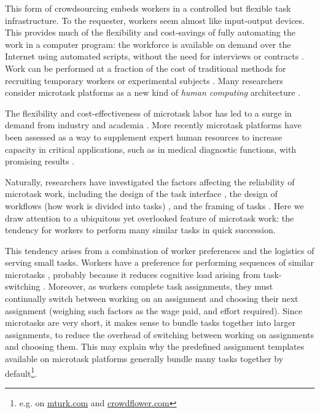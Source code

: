 \documentclass{sigchi}
\begin{document}
This form of crowdsourcing embeds workers in a controlled but flexible
task infrastructure.  
To the requester, workers seem almost like input-output devices.  
This provides much of the flexibility and 
cost-savings of fully automating the work in a computer program: 
the workforce is available on demand over the Internet using automated 
scripts, without the need for interviews or contracts 
\cite{wolfson2011look,5543192}.
Work can be performed at a fraction of the cost of traditional methods for 
recruiting temporary workers or experimental subjects
\cite{Berinsky2012351}. %
Many researchers consider microtask platforms 
as a new kind of \textit{human computing} architecture
\cite{5543192}. %

The flexibility and cost-effectiveness of microtask labor
has led to a surge in demand from industry and 
academia \cite{wolfson2011look,Berinsky2012351}.  More recently microtask 
platforms have
been assessed as a way to supplement expert human resources to increase
capacity in critical applications, such as in medical diagnostic functions,
with promising results \cite{Warby2014385}.

Naturally, researchers have investigated the factors affecting the 
reliability of microtask work, including the design of the task interface
\cite{Finnerty2013},
the design of workflows (how work is divided into tasks)
\cite{kittur2011crowdforge,Huang201077,laseckieffects},
and the framing of tasks
\cite{Kinnaird2012281,chandler2013breaking,thibodeau2013natural}.
Here we draw attention to a ubiquitous yet overlooked feature of microtask 
work: the tendency for workers to perform many similar tasks in quick 
succession.  

This tendency arises from a combination of worker preferences and the 
logistics of serving small tasks.  
Workers have a preference for performing sequences of similar microtasks
\cite{Chilton20101}, probably because it reduces 
cognitive load arising from task-switching \cite{Adamczyk2004271}.
Moreover, as workers complete task assignments, they must continually 
switch between working on an assignment and choosing their next 
assignment (weighing such factors as the wage paid, and effort required).  
Since microtasks are very short,
it makes sense to bundle tasks together into
larger assignments, to reduce the overhead of switching between  
working on assignments and choosing them.
This may explain why the predefined assignment templates available on 
microtask platforms generally bundle many tasks together by 
default\footnote{e.g. on \url{mturk.com} and \url{crowdflower.com}}.
\end{document}
